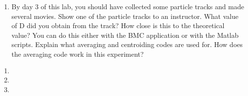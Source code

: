 \documentclass{../signatures}
\begin{document}

\begin{enumerate}

\item By day 3 of this lab, you should have collected some particle tracks and made several movies. Show one of the particle tracks to an instructor. What value of D did you obtain from the track? How close is this to the theoretical value? You can do this either with the BMC application or with the Matlab scripts. Explain what averaging and centroiding codes are used for. How does the averaging code work in this experiment?
\\[36pt]
\end{enumerate}



\checkpointsection 

\begin{enumerate}

\item {}

\item {}

\item {}

\end{enumerate}
\end{document}
